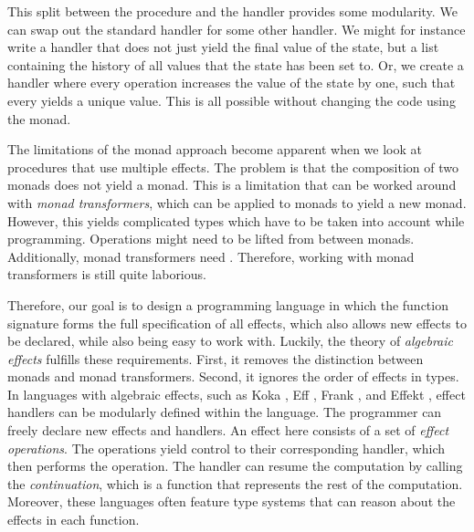This split between the procedure and the handler provides some modularity. We can swap out the standard  handler for some other handler. We might for instance write a handler that does not just yield the final value of the state, but a list containing the history of all values that the state has been set to. Or, we create a handler where every  operation increases the value of the state by one, such that every  yields a unique value. This is all possible without changing the code using the  monad.

The limitations of the monad approach become apparent when we look at procedures that use multiple effects. The problem is that the composition of two monads does not yield a monad. This is a limitation that can be worked around with \emph{monad transformers}, which can be applied to monads to yield a new monad. However, this yields complicated types which have to be taken into account while programming. Operations might need to be lifted from between monads. Additionally, monad transformers need . Therefore, working with monad transformers is still quite laborious.

Therefore, our goal is to design a programming language in which the function signature forms the full specification of all effects, which also allows new effects to be declared, while also being easy to work with. Luckily, the theory of \emph{algebraic effects} fulfills these requirements. First, it removes the distinction between monads and monad transformers. Second, it ignores the order of effects in types. In languages with algebraic effects, such as Koka \autocite{leijen_koka_2014}, Eff \autocite{bauer_programming_2015}, Frank \autocite{lindley_be_2017}, and Effekt \autocite{brachthauser_effects_2020}, effect handlers can be modularly defined within the language. The programmer can freely declare new effects and handlers. An effect here consists of a set of \emph{effect operations}. The operations yield control to their corresponding handler, which then performs the operation. The handler can resume the computation by calling the \emph{continuation}, which is a function that represents the rest of the computation. Moreover, these languages often feature type systems that can reason about the effects in each function.

